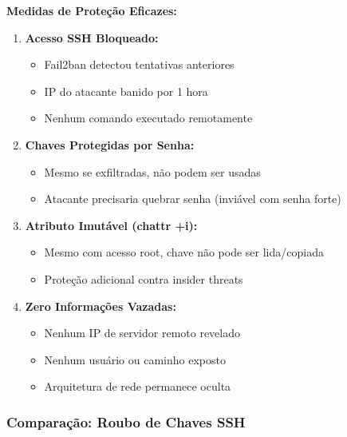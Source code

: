 \documentclass[12pt]{article}
\begin{document}
\textbf{Medidas de Proteção Eficazes:}
\begin{enumerate}
    \item \textbf{Acesso SSH Bloqueado:}
        \begin{itemize}
            \item Fail2ban detectou tentativas anteriores
            \item IP do atacante banido por 1 hora
            \item Nenhum comando executado remotamente
        \end{itemize}
    
    \item \textbf{Chaves Protegidas por Senha:}
        \begin{itemize}
            \item Mesmo se exfiltradas, não podem ser usadas
            \item Atacante precisaria quebrar senha (inviável com senha forte)
        \end{itemize}
    
    \item \textbf{Atributo Imutável (chattr +i):}
        \begin{itemize}
            \item Mesmo com acesso root, chave não pode ser lida/copiada
            \item Proteção adicional contra insider threats
        \end{itemize}
    
    \item \textbf{Zero Informações Vazadas:}
        \begin{itemize}
            \item Nenhum IP de servidor remoto revelado
            \item Nenhum usuário ou caminho exposto
            \item Arquitetura de rede permanece oculta
        \end{itemize}
\end{enumerate}

\subsubsection{Comparação: Roubo de Chaves SSH}
\end{document}
